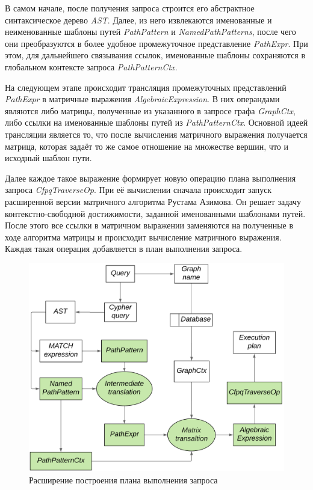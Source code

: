 \documentclass[14pt]{matmex-diploma-custom}
\newcommand{\gsv}[1]{\textcolor{red}{#1$^{\text{gsv}}$}}
\begin{document}
В самом начале, после получения запроса строится его абстрактное синтаксическое дерево \textit{AST}. Далее, из него извлекаются именованные и неименованные шаблоны путей \textit{PathPattern} и \textit{NamedPathPatterns}, после чего они преобразуются в более удобное промежуточное представление \textit{PathExpr}. При этом, для дальнейшего связывания ссылок, именованные шаблоны сохраняются в глобальном контексте запроса \textit{PathPatternCtx}.

На следующем этапе происходит трансляция промежуточных представлений \textit{PathExpr} в матричные выражения \textit{AlgebraicExpression}. В них операндами являются либо матрицы, полученные из указанного в запросе графа \textit{GraphCtx}, либо ссылки на именованные шаблоны путей из \textit{PathPatternCtx}. Основной идеей трансляции является то, что после вычисления матричного выражения получается матрица, которая задаёт то же самое отношение на множестве вершин, что и исходный шаблон пути.

Далее каждое такое выражение формирует новую операцию плана выполнения запроса \textit{CfpqTraverseOp}. При её вычислении сначала происходит запуск расширенной версии матричного алгоритма Рустама Азимова. Он решает задачу контекстно-свободной достижимости, заданной именованными шаблонами путей. После этого все ссылки в матричном выражении заменяются на полученные в ходе алгоритма матрицы и происходит вычисление матричного выражения. Каждая такая операция добавляется в план выполнения запроса.


\begin{figure}[H]
\centering
    \includegraphics[width=1.0\linewidth]{pictures/execution_plan_3.png}
    \caption{Расширение построения плана выполнения запроса}
    \label{fig:execution_plan}
\end{figure}
\end{document}
